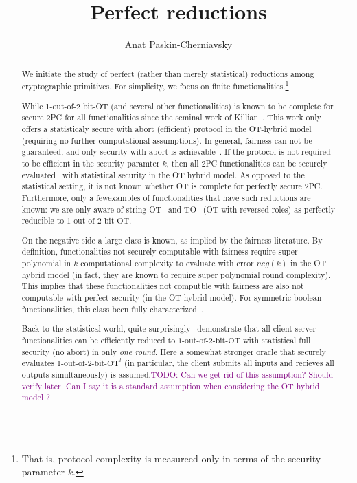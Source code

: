 \documentclass[a4paper]{article}
\title{Perfect reductions}
\author{Anat Paskin-Cherniavsky}
\newcommand{\OT}[2]{#1\text{-out-of-}#2\text{-bit-OT}}
\newcommand{\atodo}[1]{\textcolor{purple}{TODO: #1}}
\begin{document}
\maketitle

\begin{abstract}
We initiate the study of perfect (rather than merely statistical) reductions among cryptographic primitives. For simplicity, we focus on finite functionalities.\footnote{That is, protocol complexity is measureed only in terms of the security parameter $k$.}


While 1-out-of-2 bit-OT (and several other functionalities) is known to be complete for secure 2PC for all functionalities since the seminal work of Killian~\cite{Killian88}. This work only offers a statisticaly secure with abort (efficient) protocol in the OT-hybrid model (requiring no further computational assumptions). In general, fairness can not be guaranteed, and only security with abort is achievable~\cite{Cleve86}. If the protocol is not required to be efficient in the security paramter $k$, then all 2PC functionalities can be securely evaluated~\cite{GK10} with statistical security in the OT hybrid model.
As opposed to the statistical setting, it is not known whether OT is complete for perfectly secure 2PC. Furthermore, only a fewexamples of functionalities that have such reductions are known: we are only aware of string-OT~\cite{BCS96} and TO~\cite{WolfW06} (OT with reversed roles) as perfectly reducible to $\OT{1}{2}$.

On the negative side a large class is known, as implied by the fairness literature. By definition, functionalities not securely computable with fairness require super-polynomial in $k$ 
computational complexity to evaluate with error $neg(k)$ in the OT hybrid model (in fact, they are known to require super polynomial round complexity). 
This implies that these functionalities not computble with fairness are also not computable with perfect security (in the OT-hybrid model). For symmetric boolean functionalities, this class been fully characterized~\cite{}.

Back to the statistical world, quite surprisingly~\cite{IKOPS11} demonstrate that all client-server functionalities can be efficiently reduced to $\OT{1}{2}$ with statistical full security (no abort) in only \emph{one round}. Here a somewhat stronger oracle that securely evaluates ${\OT{1}{2}}^l$ (in particular, the client submits all inputs and recieves all outputs simultaneously) is assumed.\atodo{Can we get rid of this assumption? Should verify later. Can I say it is a standard assumption when considering the OT hybrid model ?}


\end{abstract}
\end{document}
